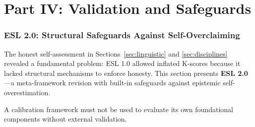 \documentclass[11pt,a4paper]{article}
\begin{document}

\part*{Part IV: Validation and Safeguards}

\begin{center}
\end{center}

\vspace{1em}

\section{ESL 2.0: Structural Safeguards Against Self-Overclaiming}
\label{sec:esl2}


The honest self-assessment in Sections~\ref{sec:linguistic} and \ref{sec:disciplines} revealed a fundamental problem: ESL 1.0 allowed inflated K-scores because it lacked structural mechanisms to enforce honesty. This section presents \textbf{ESL 2.0}---a meta-framework revision with built-in safeguards against epistemic self-overestimation.

\begin{principle}
\label{principle:anti-circ}
A calibration framework must not be used to evaluate its own foundational components without external validation.
\end{principle}
\end{document}
